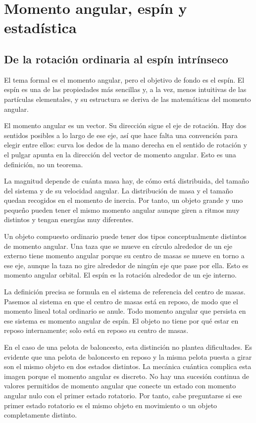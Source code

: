 \chapter{Momento angular, espín y estadística}

\section{De la rotación ordinaria al espín intrínseco}

El tema formal es el momento angular, pero el objetivo de fondo es el espín. El espín es una de las propiedades más sencillas y, a la vez, menos intuitivas de las partículas elementales, y su estructura se deriva de las matemáticas del momento angular.

El momento angular es un vector. Su dirección sigue el eje de rotación. Hay dos sentidos posibles a lo largo de ese eje, así que hace falta una convención para elegir entre ellos: curva los dedos de la mano derecha en el sentido de rotación y el pulgar apunta en la dirección del vector de momento angular. Esto es una definición, no un teorema.

La magnitud depende de cuánta masa hay, de cómo está distribuida, del tamaño del sistema y de su velocidad angular. La distribución de masa y el tamaño quedan recogidos en el momento de inercia. Por tanto, un objeto grande y uno pequeño pueden tener el mismo momento angular aunque giren a ritmos muy distintos y tengan energías muy diferentes.

Un objeto compuesto ordinario puede tener dos tipos conceptualmente distintos de momento angular. Una taza que se mueve en círculo alrededor de un eje externo tiene momento angular porque su centro de masas se mueve en torno a ese eje, aunque la taza no gire alrededor de ningún eje que pase por ella. Esto es momento angular orbital. El espín es la rotación alrededor de un eje interno.

La definición precisa se formula en el sistema de referencia del centro de masas. Pasemos al sistema en que el centro de masas está en reposo, de modo que el momento lineal total ordinario se anule. Todo momento angular que persista en ese sistema es momento angular de espín. El objeto no tiene por qué estar en reposo internamente; solo está en reposo su centro de masas.

En el caso de una pelota de baloncesto, esta distinción no plantea dificultades. Es evidente que una pelota de baloncesto en reposo y la misma pelota puesta a girar son el mismo objeto en dos estados distintos. La mecánica cuántica complica esta imagen porque el momento angular es discreto. No hay una sucesión continua de valores permitidos de momento angular que conecte un estado con momento angular nulo con el primer estado rotatorio. Por tanto, cabe preguntarse si ese primer estado rotatorio es el mismo objeto en movimiento o un objeto completamente distinto.

